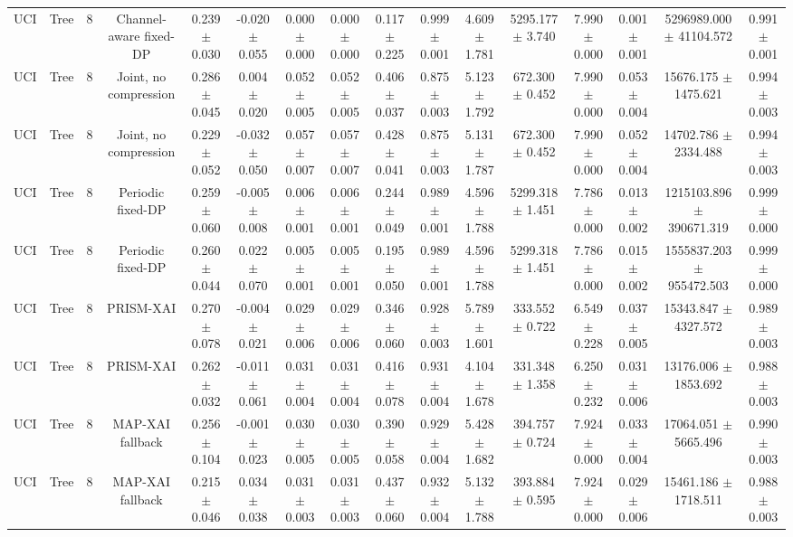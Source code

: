 \begin{tabular}{lccccccccccccccc}
UCI & Tree & 8 & Channel-aware fixed-DP & 0.239 $\pm$ 0.030 & -0.020 $\pm$ 0.055 & 0.000 $\pm$ 0.000 & 0.000 $\pm$ 0.000 & 0.117 $\pm$ 0.225 & 0.999 $\pm$ 0.001 & 4.609 $\pm$ 1.781 & 5295.177 $\pm$ 3.740 & 7.990 $\pm$ 0.000 & 0.001 $\pm$ 0.001 & 5296989.000 $\pm$ 41104.572 & 0.991 $\pm$ 0.001 \\
UCI & Tree & 8 & Joint, no compression & 0.286 $\pm$ 0.045 & 0.004 $\pm$ 0.020 & 0.052 $\pm$ 0.005 & 0.052 $\pm$ 0.005 & 0.406 $\pm$ 0.037 & 0.875 $\pm$ 0.003 & 5.123 $\pm$ 1.792 & 672.300 $\pm$ 0.452 & 7.990 $\pm$ 0.000 & 0.053 $\pm$ 0.004 & 15676.175 $\pm$ 1475.621 & 0.994 $\pm$ 0.003 \\
UCI & Tree & 8 & Joint, no compression & 0.229 $\pm$ 0.052 & -0.032 $\pm$ 0.050 & 0.057 $\pm$ 0.007 & 0.057 $\pm$ 0.007 & 0.428 $\pm$ 0.041 & 0.875 $\pm$ 0.003 & 5.131 $\pm$ 1.787 & 672.300 $\pm$ 0.452 & 7.990 $\pm$ 0.000 & 0.052 $\pm$ 0.004 & 14702.786 $\pm$ 2334.488 & 0.994 $\pm$ 0.003 \\
UCI & Tree & 8 & Periodic fixed-DP & 0.259 $\pm$ 0.060 & -0.005 $\pm$ 0.008 & 0.006 $\pm$ 0.001 & 0.006 $\pm$ 0.001 & 0.244 $\pm$ 0.049 & 0.989 $\pm$ 0.001 & 4.596 $\pm$ 1.788 & 5299.318 $\pm$ 1.451 & 7.786 $\pm$ 0.000 & 0.013 $\pm$ 0.002 & 1215103.896 $\pm$ 390671.319 & 0.999 $\pm$ 0.000 \\
UCI & Tree & 8 & Periodic fixed-DP & 0.260 $\pm$ 0.044 & 0.022 $\pm$ 0.070 & 0.005 $\pm$ 0.001 & 0.005 $\pm$ 0.001 & 0.195 $\pm$ 0.050 & 0.989 $\pm$ 0.001 & 4.596 $\pm$ 1.788 & 5299.318 $\pm$ 1.451 & 7.786 $\pm$ 0.000 & 0.015 $\pm$ 0.002 & 1555837.203 $\pm$ 955472.503 & 0.999 $\pm$ 0.000 \\
UCI & Tree & 8 & PRISM-XAI & 0.270 $\pm$ 0.078 & -0.004 $\pm$ 0.021 & 0.029 $\pm$ 0.006 & 0.029 $\pm$ 0.006 & 0.346 $\pm$ 0.060 & 0.928 $\pm$ 0.003 & 5.789 $\pm$ 1.601 & 333.552 $\pm$ 0.722 & 6.549 $\pm$ 0.228 & 0.037 $\pm$ 0.005 & 15343.847 $\pm$ 4327.572 & 0.989 $\pm$ 0.003 \\
UCI & Tree & 8 & PRISM-XAI & 0.262 $\pm$ 0.032 & -0.011 $\pm$ 0.061 & 0.031 $\pm$ 0.004 & 0.031 $\pm$ 0.004 & 0.416 $\pm$ 0.078 & 0.931 $\pm$ 0.004 & 4.104 $\pm$ 1.678 & 331.348 $\pm$ 1.358 & 6.250 $\pm$ 0.232 & 0.031 $\pm$ 0.006 & 13176.006 $\pm$ 1853.692 & 0.988 $\pm$ 0.003 \\
UCI & Tree & 8 & MAP-XAI fallback & 0.256 $\pm$ 0.104 & -0.001 $\pm$ 0.023 & 0.030 $\pm$ 0.005 & 0.030 $\pm$ 0.005 & 0.390 $\pm$ 0.058 & 0.929 $\pm$ 0.004 & 5.428 $\pm$ 1.682 & 394.757 $\pm$ 0.724 & 7.924 $\pm$ 0.000 & 0.033 $\pm$ 0.004 & 17064.051 $\pm$ 5665.496 & 0.990 $\pm$ 0.003 \\
UCI & Tree & 8 & MAP-XAI fallback & 0.215 $\pm$ 0.046 & 0.034 $\pm$ 0.038 & 0.031 $\pm$ 0.003 & 0.031 $\pm$ 0.003 & 0.437 $\pm$ 0.060 & 0.932 $\pm$ 0.004 & 5.132 $\pm$ 1.788 & 393.884 $\pm$ 0.595 & 7.924 $\pm$ 0.000 & 0.029 $\pm$ 0.006 & 15461.186 $\pm$ 1718.511 & 0.988 $\pm$ 0.003 \\
\bottomrule
\end{tabular}
